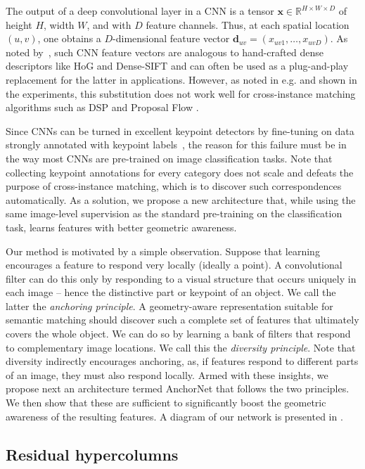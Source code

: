 \documentclass[10pt,twocolumn,letterpaper]{article}
\newcommand{\bx}{\mathbf{x}}
\begin{document}
The output of a deep convolutional layer in a CNN is a tensor $\bx \in \mathbb{R}^{H\times W\times D}$ of height $H$, width $W$, and with $D$ feature channels. Thus, at each spatial location $(u,v)$, one obtains a $D$-dimensional feature vector $\mathbf{d}_{uv} = (x_{uv1}, \dots, x_{uvD})$. As noted by~\cite{cimpoi15deep}, such CNN feature vectors are analogous to hand-crafted dense descriptors like HoG and Dense-SIFT and can often be used as a plug-and-play replacement for the latter in applications. However, as noted in e.g. \cite{long2014do} and shown in the experiments, this substitution does not work well for cross-instance matching algorithms such as DSP \cite{kim2013deformable} and Proposal Flow \cite{ham2016}.

Since CNNs can be turned in excellent keypoint detectors by fine-tuning on data strongly annotated with keypoint labels~\cite{choy16universal,tulsiani2015viewpoints}, the reason for this failure must be in the way most CNNs are pre-trained on image classification tasks. Note that collecting keypoint annotations for every category does not scale and defeats the purpose of cross-instance matching, which is to discover such correspondences automatically. As a solution, we propose a new architecture that, while using the same image-level supervision as the standard pre-training on the classification task, learns features with better geometric awareness.

Our method is motivated by a simple observation. Suppose that learning encourages a feature to respond very locally (ideally a point). 
A convolutional filter can do this only by responding to a visual structure that occurs uniquely in each image -- hence the distinctive part or keypoint of an object. We call the latter the \emph{anchoring principle}. A geometry-aware representation suitable for semantic matching should discover such a complete set of features that ultimately covers the whole object. We can do so by learning a bank of filters that respond to complementary image locations. We call this the \emph{diversity principle}. Note that diversity indirectly encourages anchoring, as, if features respond to different parts of an image, they must also respond locally.
Armed with these insights, we propose next an architecture termed AnchorNet that follows the two principles. We then show that these are sufficient to significantly boost the geometric awareness of the resulting features. A diagram of our network is presented in .

\subsection{Residual hypercolumns}\label{s:hc}
\end{document}
